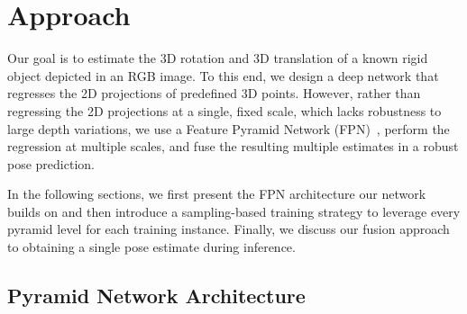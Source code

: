 
\section{Approach}
\label{sec:approach}

Our goal is to estimate the 3D rotation and 3D translation of a known rigid object depicted in an RGB image. To this end, 
we design a deep network that regresses the 2D projections of predefined 3D points. However, rather than regressing the 2D projections at a single, fixed scale, which lacks robustness to large depth variations, we use a Feature Pyramid Network (FPN)~\cite{Lin17e}, perform the regression at multiple scales, and fuse the resulting multiple estimates in a robust pose prediction.

In the following sections, we first present the FPN architecture our network builds on and then introduce a sampling-based training strategy to leverage every pyramid level for each training instance. Finally, we discuss our fusion approach to obtaining a single pose estimate during inference.

\subsection{Pyramid Network Architecture}

